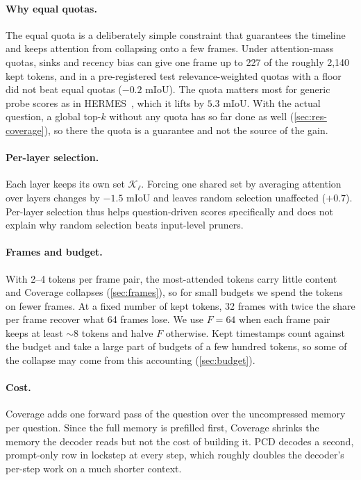 \paragraph{Why equal quotas.}
The equal quota is a deliberately simple constraint that guarantees the timeline and keeps attention from
collapsing onto a few frames. Under attention-mass quotas, sinks and recency bias can give one frame up to 227 of
the roughly 2{,}140 kept tokens, and in a pre-registered test relevance-weighted quotas with a floor did not beat
equal quotas ($-0.2$ mIoU). The quota matters most for generic probe scores as in HERMES~\cite{hermes}, which it
lifts by $5.3$ mIoU. With the actual question, a global top-$k$ without any quota has so far done as well
(\cref{sec:res-coverage}), so there the quota is a guarantee and not the source of the gain.

\paragraph{Per-layer selection.}
Each layer keeps its own set $\mathcal{K}_\ell$. Forcing one shared set by averaging attention over layers changes
\method by $-1.5$ mIoU and leaves random selection unaffected ($+0.7$). Per-layer selection thus helps
question-driven scores specifically and does not explain why random selection beats input-level pruners.

\paragraph{Frames and budget.}
With 2--4 tokens per frame pair, the most-attended tokens carry little content and Coverage collapses
(\cref{sec:frames}), so for small budgets we spend the tokens on fewer frames. At a fixed number of kept tokens, 32
frames with twice the share per frame recover what 64 frames lose. We use $F{=}64$ when each frame pair keeps at
least ${\sim}8$ tokens and halve $F$ otherwise. Kept timestamps count against the budget and take a large part of
budgets of a few hundred tokens, so some of the collapse may come from this accounting (\cref{sec:budget}).

\paragraph{Cost.}
Coverage adds one forward pass of the question over the uncompressed memory per question. Since the full memory is
prefilled first, Coverage shrinks the memory the decoder reads but not the cost of building it. PCD decodes a
second, prompt-only row in lockstep at every step, which roughly doubles the decoder's per-step work on a much
shorter context. 

